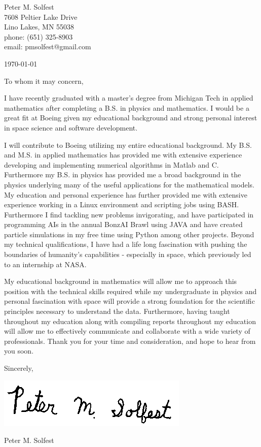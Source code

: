 \documentclass[letterpaper,12pt]{article}
\begin{document}
Peter M. Solfest\\
7608 Peltier Lake Drive\\
Lino Lakes, MN 55038\\
phone: (651) 325-8903\\
email: pmsolfest@gmail.com

\today

To whom it may concern,

I have recently graduated with a master's degree from Michigan Tech in applied mathematics after
completing a B.S. in physics and mathematics.
I would be a great fit at Boeing given my educational background
and strong personal interest in space science and software development.

I will contribute to Boeing utilizing my entire educational background.
My B.S. and M.S. in applied mathematics has provided me with extensive experience developing
and implementing numerical algorithms in Matlab and C.
Furthermore my B.S. in physics has provided me a broad background in the physics
underlying many of the useful applications for the mathematical models.
My education and personal experience has further provided me with
extensive experience working in a Linux environment and scripting
jobs using BASH.
Furthermore I find tackling new problems invigorating, and have
participated in programming AIs in the annual BonzAI Brawl using JAVA and
have created particle simulations in my free time using Python among
other projects.
Beyond my technical qualifications, I have had a life long fascination with
pushing the boundaries of humanity's capabilities - especially in space, which
previously led to an internship at NASA.

My educational background in mathematics will allow 
me to approach this position with the technical skills required
while my undergraduate in physics and personal fascination with space
will provide a strong foundation for the scientific principles necessary
to understand the data.
Furthermore, having taught throughout my education along with compiling reports
throughout my education will allow me to effectively communicate and
collaborate with a wide variety of professionals.
Thank you for your time and consideration, and hope to hear from you soon.


Sincerely,

\includegraphics[height=.5in]{signature.png}

Peter M. Solfest
\end{document}

